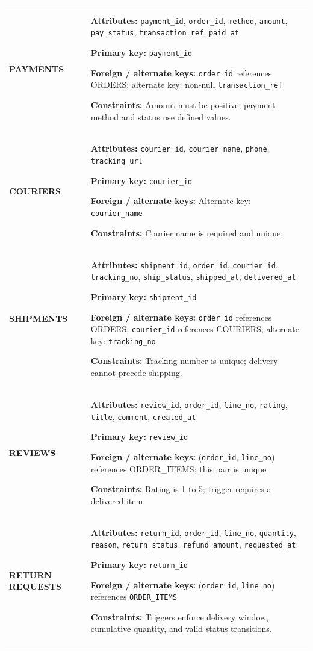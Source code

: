 \documentclass[11pt,a4paper,oneside]{report}
\begin{document}
\begin{longtable}{@{}P{39mm}P{117mm}@{}}
\textbf{PAYMENTS} & \textbf{Attributes:} \texttt{payment\_id}, \texttt{order\_id}, \texttt{method}, \texttt{amount}, \texttt{pay\_status}, \texttt{transaction\_ref}, \texttt{paid\_at}\par\textbf{Primary key:} \texttt{payment\_id}\par\textbf{Foreign / alternate keys:} \texttt{order\_id} references ORDERS; alternate key: non-null \texttt{transaction\_ref}\par\textbf{Constraints:} Amount must be positive; payment method and status use defined values. \\
\textbf{COURIERS} & \textbf{Attributes:} \texttt{courier\_id}, \texttt{courier\_name}, \texttt{phone}, \texttt{tracking\_url}\par\textbf{Primary key:} \texttt{courier\_id}\par\textbf{Foreign / alternate keys:} Alternate key: \texttt{courier\_name}\par\textbf{Constraints:} Courier name is required and unique. \\
\textbf{SHIPMENTS} & \textbf{Attributes:} \texttt{shipment\_id}, \texttt{order\_id}, \texttt{courier\_id}, \texttt{tracking\_no}, \texttt{ship\_status}, \texttt{shipped\_at}, \texttt{delivered\_at}\par\textbf{Primary key:} \texttt{shipment\_id}\par\textbf{Foreign / alternate keys:} \texttt{order\_id} references ORDERS; \texttt{courier\_id} references COURIERS; alternate key: \texttt{tracking\_no}\par\textbf{Constraints:} Tracking number is unique; delivery cannot precede shipping. \\
\textbf{REVIEWS} & \textbf{Attributes:} \texttt{review\_id}, \texttt{order\_id}, \texttt{line\_no}, \texttt{rating}, \texttt{title}, \texttt{comment}, \texttt{created\_at}\par\textbf{Primary key:} \texttt{review\_id}\par\textbf{Foreign / alternate keys:} (\texttt{order\_id}, \texttt{line\_no}) references ORDER\_ITEMS; this pair is unique\par\textbf{Constraints:} Rating is 1 to 5; trigger requires a delivered item. \\
\textbf{RETURN REQUESTS} & \textbf{Attributes:} \texttt{return\_id}, \texttt{order\_id}, \texttt{line\_no}, \texttt{quantity}, \texttt{reason}, \texttt{return\_status}, \texttt{refund\_amount}, \texttt{requested\_at}\par\textbf{Primary key:} \texttt{return\_id}\par\textbf{Foreign / alternate keys:} (\texttt{order\_id}, \texttt{line\_no}) references \texttt{ORDER\_ITEMS}\par\textbf{Constraints:} Triggers enforce delivery window, cumulative quantity, and valid status transitions. \\

\end{longtable}
\end{document}
